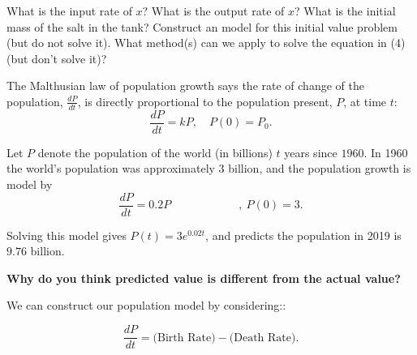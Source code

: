 \begin{enumerate}
\ii What is the input rate of $x$? \vspace{0.5in}
\ii What is the output rate of $x$?  \vspace{0.5in}
\ii What is the initial mass of the salt in the tank?  \vspace{0.5in}
\ii Construct an model for this initial value problem (but do not solve it).  \vspace{0.5in}
\ii What method(s) can we apply to solve the equation in (4) (but don't solve it)? 
\ee

\ee


\clearpage


\bbox
The \alert{Malthusian} law of population growth says the rate of change of the population, $\frac{dP}{dt}$,
is \alert{directly proportional to the population present}, $P$, at time $t$:
\[ \frac{dP}{dt} = kP, \quad P(0)=P_0.\]
\ebox

\bs 

\begin{ex}
 Let $P$ denote the population of the world (in billions) $t$ years since $1960$. In 1960 the world's population was approximately 3 billion, and the population growth is model by
\[ \frac{dP}{dt} =0.2P  \hspace{1in} , \ P(0)=3.\] 

Solving this model gives $P(t)=3e^{0.02t}$, and predicts the population in 2019 is $9.76$ billion.  \bs

\noindent \textbf{Why do you think predicted value is different from the actual value?}
\end{ex}


\clearpage


\bbox
We can construct our population model by considering::

\[ \frac{dP}{dt} = \bigg( \mbox{Birth Rate} \bigg) - \bigg( \mbox{Death Rate} \bigg).\] \bs


\end{enumerate}
